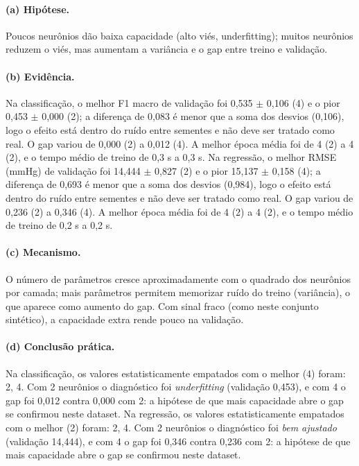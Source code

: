 \documentclass[11pt,a4paper]{article}
\begin{document}
\paragraph{(a) Hipótese.} Poucos neurônios dão baixa capacidade (alto viés, underfitting); muitos neurônios reduzem o viés, mas aumentam a variância e o gap entre treino e validação.

\paragraph{(b) Evidência.} Na classificação, o melhor F1 macro de validação foi 0,535 $\pm$ 0,106 (4) e o pior 0,453 $\pm$ 0,000 (2); a diferença de 0,083 é menor que a soma dos desvios (0,106), logo o efeito está dentro do ruído entre sementes e não deve ser tratado como real. O gap variou de 0,000 (2) a 0,012 (4). A melhor época média foi de 4 (2) a 4 (2), e o tempo médio de treino de 0,3 s a 0,3 s. Na regressão, o melhor RMSE (mmHg) de validação foi 14,444 $\pm$ 0,827 (2) e o pior 15,137 $\pm$ 0,158 (4); a diferença de 0,693 é menor que a soma dos desvios (0,984), logo o efeito está dentro do ruído entre sementes e não deve ser tratado como real. O gap variou de 0,236 (2) a 0,346 (4). A melhor época média foi de 4 (2) a 4 (2), e o tempo médio de treino de 0,2 s a 0,2 s.

\paragraph{(c) Mecanismo.} O número de parâmetros cresce aproximadamente com o quadrado dos neurônios por camada; mais parâmetros permitem memorizar ruído do treino (variância), o que aparece como aumento do gap. Com sinal fraco (como neste conjunto sintético), a capacidade extra rende pouco na validação.

\paragraph{(d) Conclusão prática.} Na classificação, os valores estatisticamente empatados com o melhor (4) foram: 2, 4. Com 2 neurônios o diagnóstico foi \emph{underfitting} (validação 0,453), e com 4 o gap foi 0,012 contra 0,000 com 2: a hipótese de que mais capacidade abre o gap se confirmou neste dataset. Na regressão, os valores estatisticamente empatados com o melhor (2) foram: 2, 4. Com 2 neurônios o diagnóstico foi \emph{bem ajustado} (validação 14,444), e com 4 o gap foi 0,346 contra 0,236 com 2: a hipótese de que mais capacidade abre o gap se confirmou neste dataset.
\end{document}
